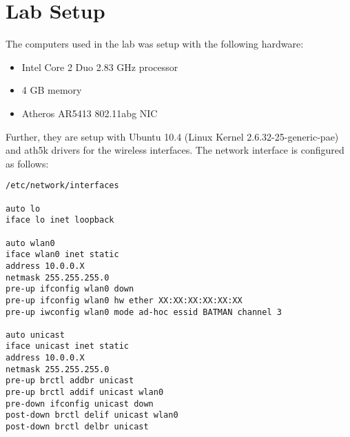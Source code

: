 \chapter{Lab Setup}
\label{lab_setup}

The computers used in the lab was setup with the following hardware:

\begin{itemize}
\item Intel Core 2 Duo 2.83 GHz processor
\item 4 GB memory
\item Atheros AR5413 802.11abg NIC
\end{itemize}

\noindent
Further, they are setup with Ubuntu 10.4 (Linux Kernel 2.6.32-25-generic-pae) and ath5k drivers for the wireless interfaces. The network interface is configured as follows:


\begin{lstlisting}[frame=tb]
/etc/network/interfaces

auto lo
iface lo inet loopback

auto wlan0
iface wlan0 inet static
address 10.0.0.X
netmask 255.255.255.0
pre-up ifconfig wlan0 down
pre-up ifconfig wlan0 hw ether XX:XX:XX:XX:XX:XX
pre-up iwconfig wlan0 mode ad-hoc essid BATMAN channel 3

auto unicast
iface unicast inet static
address 10.0.0.X
netmask 255.255.255.0
pre-up brctl addbr unicast
pre-up brctl addif unicast wlan0
pre-down ifconfig unicast down
post-down brctl delif unicast wlan0
post-down brctl delbr unicast
\end{lstlisting}

